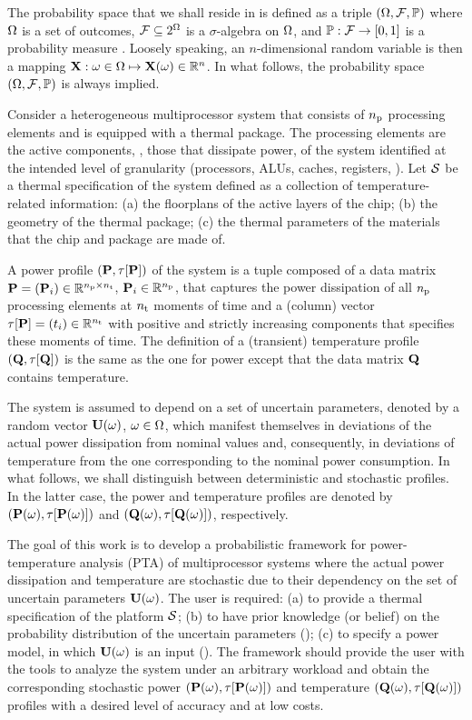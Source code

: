 
The probability space that we shall reside in is defined as a triple $(\Omega, \mathcal{F}, \mathbb{P})$ where $\Omega$ is a set of outcomes, $\mathcal{F} \subseteq 2^\Omega$ is a $\sigma$-algebra on $\Omega$, and $\mathbb{P}: \mathcal{F} \to [0, 1]$ is a probability measure \cite{maitre2010}.
Loosely speaking, an $n$-dimensional random variable is then a mapping $\mathbf{X}: \omega \in \Omega \mapsto \mathbf{X}(\omega) \in \mathbb{R}^n$.
In what follows, the probability space $(\Omega, \mathcal{F}, \mathbb{P})$ is always implied.

Consider a heterogeneous multiprocessor system that consists of ${n_\text{p}}$ processing elements and is equipped with a thermal package.
The processing elements are the active components, \ie, those that dissipate power, of the system identified at the intended level of granularity (processors, ALUs, caches, registers, \etc).
Let $\mathcal{S}$ be a thermal specification of the system defined as a collection of temperature-related information: (a) the floorplans of the active layers of the chip; (b) the geometry of the thermal package; (c) the thermal parameters of the materials that the chip and package are made of.

A power profile $\profileP$ of the system is a tuple composed of a data matrix $\mP = (\vP_i) \in \real^{\nprocs \times \nsteps}$, $\mathbf{P}_i \in \mathbb{R}^{n_\text{p}}$, that captures the power dissipation of all ${n_\text{p}}$ processing elements at ${n_\text{t}}$ moments of time and a (column) vector $\partition{\mP} = (\t_i) \in \real^{\nsteps}$ with positive and strictly increasing components that specifies these moments of time.
The definition of a (transient) temperature profile $\profileT$ is the same as the one for power except that the data matrix $\mTO$ contains temperature.

The system is assumed to depend on a set of uncertain parameters, denoted by a random vector $\mathbf{U}(\omega)$, $\omega \in \Omega$, which manifest themselves in deviations of the actual power dissipation from nominal values and, consequently, in deviations of temperature from the one corresponding to the nominal power consumption.
In what follows, we shall distinguish between deterministic and stochastic profiles.
In the latter case, the power and temperature profiles are denoted by $\profileP{\o}$ and $\profileT{\o}$, respectively.

The goal of this work is to develop a probabilistic framework for power-temperature analysis (PTA) of multiprocessor systems where the actual power dissipation and temperature are stochastic due to their dependency on the set of uncertain parameters $\mathbf{U}(\omega)$.
The user is required: (a) to provide a thermal specification of the platform $\mathcal{S}$; (b) to have prior knowledge (or belief) on the probability distribution of the uncertain parameters (); (c) to specify a power model, in which $\mathbf{U}(\omega)$ is an input ().
The framework should provide the user with the tools to analyze the system under an arbitrary workload and obtain the corresponding stochastic power $\profileP{\o}$ and temperature $\profileT{\o}$ profiles with a desired level of accuracy and at low costs.
